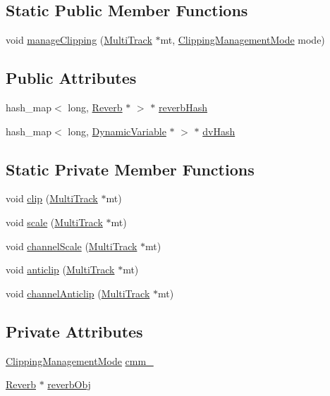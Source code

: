 \subsection*{Static Public Member Functions}
\begin{CompactItemize}
\item 
void \hyperlink{classScore_e0}{manage\-Clipping} (\hyperlink{classMultiTrack}{Multi\-Track} $\ast$mt, \hyperlink{classScore_w6}{Clipping\-Management\-Mode} mode)
\end{CompactItemize}
\subsection*{Public Attributes}
\begin{CompactItemize}
\item 
hash\_\-map$<$ long, \hyperlink{classReverb}{Reverb} $\ast$ $>$ $\ast$ \hyperlink{classScore_o0}{reverb\-Hash}
\item 
hash\_\-map$<$ long, \hyperlink{classDynamicVariable}{Dynamic\-Variable} $\ast$ $>$ $\ast$ \hyperlink{classScore_o1}{dv\-Hash}
\end{CompactItemize}
\subsection*{Static Private Member Functions}
\begin{CompactItemize}
\item 
void \hyperlink{classScore_h0}{clip} (\hyperlink{classMultiTrack}{Multi\-Track} $\ast$mt)
\item 
void \hyperlink{classScore_h1}{scale} (\hyperlink{classMultiTrack}{Multi\-Track} $\ast$mt)
\item 
void \hyperlink{classScore_h2}{channel\-Scale} (\hyperlink{classMultiTrack}{Multi\-Track} $\ast$mt)
\item 
void \hyperlink{classScore_h3}{anticlip} (\hyperlink{classMultiTrack}{Multi\-Track} $\ast$mt)
\item 
void \hyperlink{classScore_h4}{channel\-Anticlip} (\hyperlink{classMultiTrack}{Multi\-Track} $\ast$mt)
\end{CompactItemize}
\subsection*{Private Attributes}
\begin{CompactItemize}
\item 
\hyperlink{classScore_w6}{Clipping\-Management\-Mode} \hyperlink{classScore_r0}{cmm\_\-}
\item 
\hyperlink{classReverb}{Reverb} $\ast$ \hyperlink{classScore_r1}{reverb\-Obj}
\end{CompactItemize}


